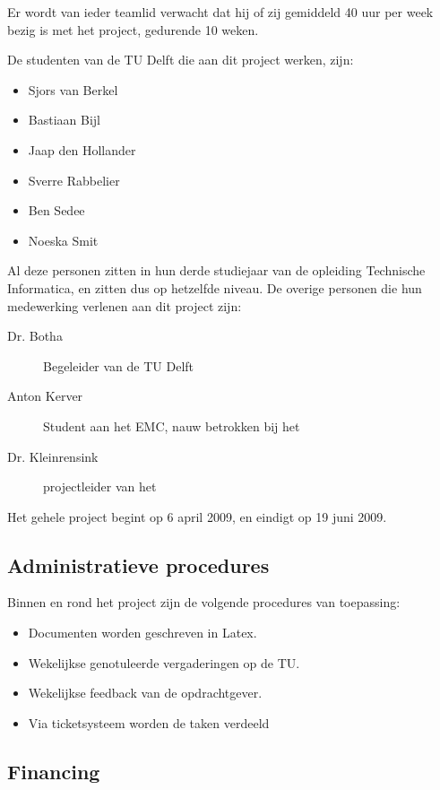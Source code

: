 Er wordt van ieder teamlid verwacht dat hij of zij gemiddeld 40 uur per week bezig is met het project, gedurende 10 weken.

De studenten van de TU Delft die aan dit project werken, zijn:
\begin{itemize}
	\item Sjors van Berkel
	\item Bastiaan Bijl
	\item Jaap den Hollander
	\item Sverre Rabbelier
	\item Ben Sedee
	\item Noeska Smit
\end{itemize}
Al deze personen zitten in hun derde studiejaar van de opleiding Technische Informatica, en zitten dus op hetzelfde niveau. 
De overige personen die hun medewerking verlenen aan dit project zijn:
\begin{description}
	\item[Dr. Botha] Begeleider van de TU Delft
	\item[Anton Kerver] Student aan het EMC, nauw betrokken bij het \casamproject
	\item[Dr. Kleinrensink] projectleider van het \casamproject
\end{description}

Het gehele project begint op 6 april 2009, en eindigt op 19 juni 2009.

\subsection{Administratieve procedures}

Binnen en rond het project zijn de volgende procedures van toepassing:

\begin{itemize}
    \item Documenten worden geschreven in Latex.
    \item Wekelijkse genotuleerde vergaderingen op de TU.
    \item Wekelijkse feedback van de opdrachtgever.
    \item Via ticketsysteem worden de taken verdeeld
\end{itemize}

\subsection{Financing}

